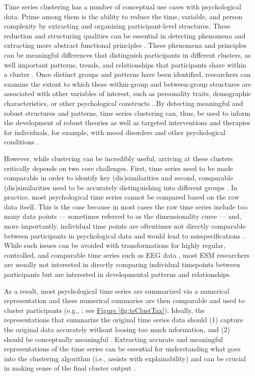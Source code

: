 \documentclass[man, 12pt, a4paper, mask, floatsintext]{apa7}
\theoremstyle{break}
\theoremstyle{plain}
\newcommand{\fgrref}[2][]{\hyperref[#2]{Figure \ref*{#2}#1}}
\begin{document}
Time series clustering has a number of conceptual use cases with psychological data. Prime among them is the ability to reduce the time, variable, and person complexity by extracting and organizing participant-level structures. These reduction and structuring qualities can be essential in detecting phenomena and extracting more abstract functional principles \citep[][]{eronen2021a}. These phenomena and principles can be meaningful differences that distinguish participants in different clusters, as well important patterns, trends, and relationships that participants share within a cluster \citep[e.g.,][]{schrodt2000}. Once distinct groups and patterns have been identified, researchers can examine the extent to which these within-group and between-group structures are associated with other variables of interest, such as personality traits, demographic characteristics, or other psychological constructs \citep[e.g.,][]{monden2022}. By detecting meaningful and robust structures and patterns, time series clustering can, thus, be used to inform the development of robust theories as well as targeted interventions and therapies for individuals, for example, with mood disorders and other psychological conditions \citep[e.g.,][]{borsboom2021, eronen2020}.

However, while clustering can be incredibly useful, arriving at these clusters critically depends on two core challenges. First, time series need to be made comparable in order to identify key (dis)similarities and second, comparable (dis)similarities need to be accurately distinguishing into different groups \citep[e.g.,][]{Aghabozorgi2015}. In practice, most psychological time series cannot be compared based on the raw data itself. This is the case because in most cases the raw time series include too many data points --- sometimes referred to as the dimensionality curse \citep[e.g.,][]{altman2018} --- and, more importantly, individual time points are oftentimes not directly comparable between participants in psychological data and would lead to misspecifications \citep[e.g., ][]{faloutsos1994}. While such issues can be avoided with transformations for highly regular, controlled, and comparable time series such as EEG data \citep[e.g.,][]{huang1985}, most ESM researchers are usually not interested in directly comparing individual timepoints between participants but are interested in developmental patterns and relationships. 

As a result, most psychological time series are summarized via a numerical representation and these numerical summaries are then comparable and used to cluster participants (e.g., \citealp[]{timmerman2013}; see \fgrref{fig:tsClustTax}). Ideally, the representations that summarize the original time series data should (1) capture the original data accurately without loosing too much information, and (2) should be conceptually meaningful \citep[][]{vandermaaten2009}. Extracting accurate and meaningful representations of the time series can be essential for understanding what goes into the clustering algorithm (i.e., assists with explainability) and can be crucial in making sense of the final cluster output \citep[i.e., assists with interpretability; e.g.,][]{Kennedy2021}. 
\end{document}

